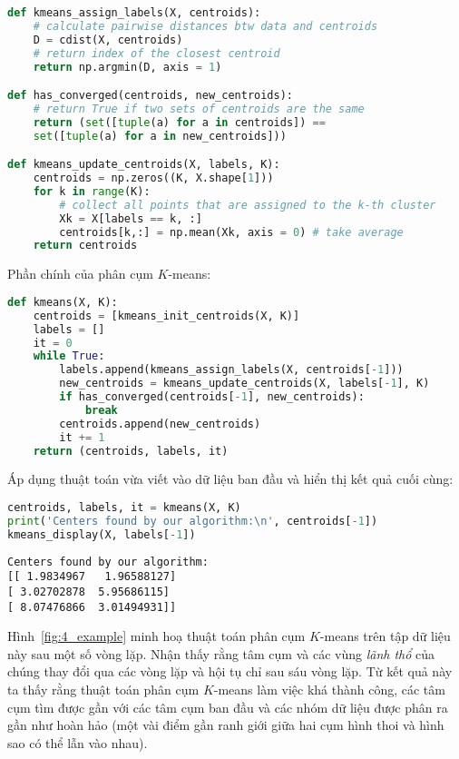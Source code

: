 \begin{lstlisting}[language=Python]
def kmeans_assign_labels(X, centroids):
    # calculate pairwise distances btw data and centroids
    D = cdist(X, centroids)
    # return index of the closest centroid
    return np.argmin(D, axis = 1)

def has_converged(centroids, new_centroids):
    # return True if two sets of centroids are the same
    return (set([tuple(a) for a in centroids]) ==
    set([tuple(a) for a in new_centroids]))

def kmeans_update_centroids(X, labels, K):
    centroids = np.zeros((K, X.shape[1]))
    for k in range(K):
        # collect all points that are assigned to the k-th cluster
        Xk = X[labels == k, :]
        centroids[k,:] = np.mean(Xk, axis = 0) # take average
    return centroids
\end{lstlisting}

Phần chính của phân cụm $K$-means:


\begin{lstlisting}[language=Python]
def kmeans(X, K):
    centroids = [kmeans_init_centroids(X, K)]
    labels = []
    it = 0
    while True:
        labels.append(kmeans_assign_labels(X, centroids[-1]))
        new_centroids = kmeans_update_centroids(X, labels[-1], K)
        if has_converged(centroids[-1], new_centroids):
            break
        centroids.append(new_centroids)
        it += 1
    return (centroids, labels, it)
\end{lstlisting}

Áp dụng thuật toán vừa viết vào dữ liệu ban đầu và hiển thị kết quả cuối cùng:


\begin{lstlisting}[language=Python]
centroids, labels, it = kmeans(X, K)
print('Centers found by our algorithm:\n', centroids[-1])
kmeans_display(X, labels[-1])
\end{lstlisting}
\kq
\begin{lstlisting}
Centers found by our algorithm:
[[ 1.9834967   1.96588127]
[ 3.02702878  5.95686115]
[ 8.07476866  3.01494931]]
\end{lstlisting}


Hình~\ref{fig:4_example} minh hoạ thuật toán phân cụm $K$-means trên tập dữ
liệu này sau một số vòng lặp. Nhận thấy rằng tâm cụm và các vùng
\textit{lãnh thổ} của chúng thay đổi qua các vòng lặp và hội tụ chỉ sau sáu vòng
lặp. Từ kết quả này ta thấy rằng thuật toán phân cụm $K$-means làm việc
khá thành công, các tâm cụm tìm được gần với các tâm cụm ban đầu và các nhóm
dữ liệu được phân ra gần như hoàn hảo (một vài điểm gần ranh giới giữa hai
cụm hình thoi và hình sao có thể lẫn vào nhau).

